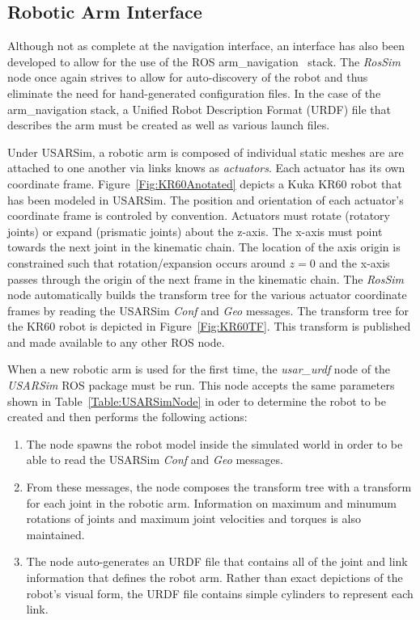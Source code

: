 \subsection*{Robotic Arm Interface}
Although not as complete at the navigation interface, an interface has also been developed to allow for the use of the ROS arm\_navigation~\cite{RosArmNavWeb} stack. The {\it RosSim} node once again strives to allow for auto-discovery of the robot and thus eliminate the need for hand-generated configuration files. In the case of the arm\_navigation stack, a Unified Robot Description Format (URDF) file that describes the arm must be created as well as various launch files. 

Under USARSim, a robotic arm is composed of individual static meshes are are attached to one another via  links knows as {\it actuators}. Each actuator has its own coordinate frame. Figure~\ref{Fig:KR60Anotated} depicts a Kuka KR60 robot that has been modeled in USARSim. The position and orientation of each actuator's coordinate frame is controled by convention. Actuators must rotate (rotatory joints) or expand (prismatic joints) about the z-axis. The x-axis must point towards the next joint in the kinematic chain. The location of the axis origin is constrained such that rotation/expansion occurs around $z=0$ and the x-axis passes through the origin of the next frame in the kinematic chain. The {\it RosSim} node automatically builds the transform tree for the various actuator coordinate frames by reading the USARSim {\it Conf} and {\it Geo} messages. The transform tree for the KR60 robot is depicted in Figure~\ref{Fig:KR60TF}. This transform is published and made available to any other ROS node.

When a new robotic arm is used for the first time, the {\it usar\_urdf} node of the {\it USARSim} ROS package must be run. This node accepts the same parameters shown in Table~\ref{Table:USARSimNode} in oder to determine the robot to be created and then performs the following actions:
\begin{enumerate}
\item The node spawns the robot model inside the simulated world in order to be able to read the USARSim  {\it Conf} and {\it Geo} messages.
\item From these messages, the node composes the transform tree with a transform for each joint in the robotic arm. Information on maximum and minumum rotations of joints and maximum joint velocities and torques is also maintained.
\item The node auto-generates an URDF file that contains all of the joint and link information that defines the robot arm. Rather than exact depictions of the robot's visual form, the URDF file contains simple cylinders to represent each link.
\end{enumerate}

